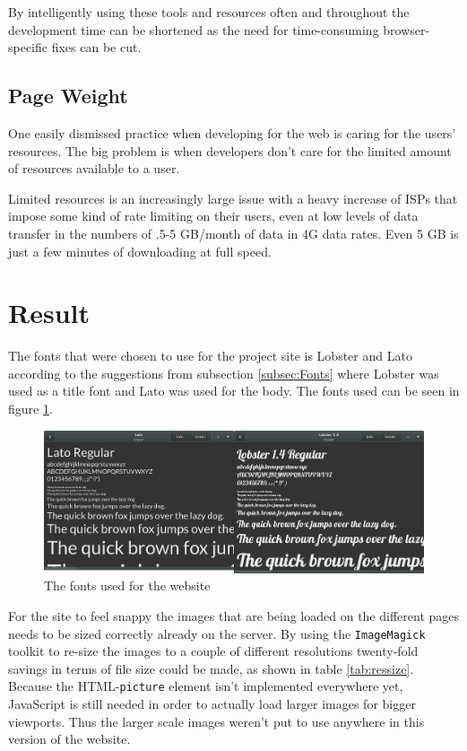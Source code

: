 \documentclass[a4paper]{scrartcl}
\begin{document}
By intelligently using these tools and resources often and throughout the development time can be shortened as the need for time-consuming browser-specific fixes can be cut.

\subsection{Page Weight}
\label{subsec:PageWeight}

One easily dismissed practice when developing for the web is caring for the users' resources. The big problem is when developers don't care for the limited amount of resources available to a user.

Limited resources is an increasingly large issue with a heavy increase of ISPs that impose some kind of rate limiting on their users, even at low levels of data transfer in the numbers of .5-5 GB/month of data in 4G data rates. Even 5 GB is just a few minutes of downloading at full speed.

\section{Result}
\label{sec:results}

The fonts that were chosen to use for the project site is Lobster and Lato according to the suggestions from subsection \ref{subsec:Fonts} where Lobster was used as a title font and Lato was used for the body. The fonts used can be seen in figure \ref{fig:fonts}.

\begin{figure}[h]
  \begin{center}
    \includegraphics[scale=0.3]{fonts.png}
    \caption{The fonts used for the website}
    \label{fig:fonts}
  \end{center}
\end{figure}

For the site to feel snappy the images that are being loaded on the different pages needs to be sized correctly already on the server. By using the \texttt{ImageMagick} toolkit to re-size the images to a couple of different resolutions twenty-fold savings in terms of file size could be made, as shown in table \ref{tab:ressize}. Because the HTML-\texttt{picture} element isn't implemented everywhere yet, JavaScript is still needed in order to actually load larger images for bigger viewports. Thus the larger scale images weren't put to use anywhere in this version of the website.
\end{document}
